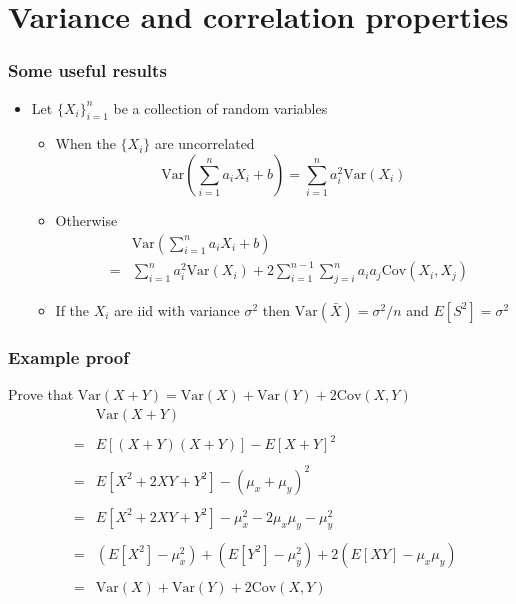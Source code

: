 \documentclass[aspectratio=169]{beamer}
\newcommand{\Cov}{\mathrm{Cov}}
\newcommand{\Var}{\mathrm{Var}}
\begin{document}
\section{Variance and correlation properties}
\begin{frame}\frametitle{Some useful results}
  \begin{itemize}
  \item Let $\{X_i\}_{i=1}^n$ be a collection of random variables
  \begin{itemize}
  \item When the $\{X_i\}$ are uncorrelated 
    $$\Var\left(\sum_{i=1}^n a_i X_i + b\right) = \sum_{i=1}^n a_i^2
    \Var(X_i)$$  
  \item Otherwise
    \begin{eqnarray*}
&   &  \Var\left(\sum_{i=1}^n a_i X_i + b\right)\\
& = &\sum_{i=1}^n a_i^2 \Var(X_i) + 2 \sum_{i=1}^{n-1} \sum_{j=i}^n a_i a_j \Cov(X_i, X_j)
    \end{eqnarray*}
  \item If the $X_i$ are iid with variance $\sigma^2$ then $\Var(\bar X) = \sigma^2/n$ and
    $E[S^2] = \sigma^2$
  \end{itemize}
\end{itemize}
\end{frame}

\begin{frame}\frametitle{Example proof}
  Prove that $\Var(X+Y) = \Var(X) + \Var(Y) + 2 \Cov(X, Y)$
\hspace{-1in}  \begin{eqnarray*}
    &   & \Var(X + Y) \\ \\
    & = & E[(X + Y)(X + Y)] - E[X + Y]^2 \\ \\
    & = & E[X^2 + 2XY + Y^2] - (\mu_x + \mu_y)^2 \\ \\
    & = & E[X^2 + 2XY + Y^2] - \mu_x^2 - 2\mu_x\mu_y -\mu_y^2 \\ \\
    & = & (E[X^2]-\mu_x^2) + (E[Y^2] - \mu_y^2) + 2(E[XY] - \mu_x\mu_y)\\ \\
    & = & \Var(X) + \Var(Y) + 2 \Cov(X, Y)
  \end{eqnarray*}
\end{frame}
\end{document}
